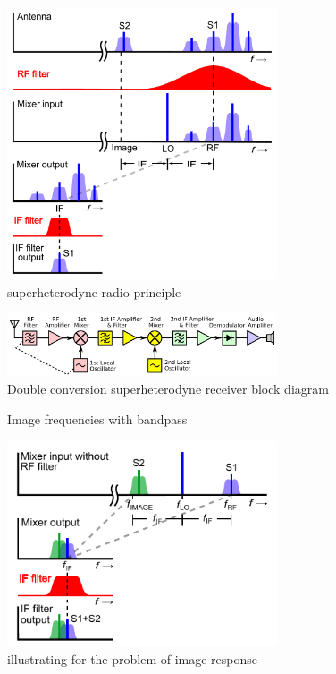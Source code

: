 \begin{figure}[ht]
  \centering
  \includegraphics[width=8cm]{images/Superheterodyne2.pdf}
  \caption{superheterodyne radio principle}
  \label{fig:typical_superheterodyne_receiver_principle}
\end{figure}
\begin{figure}[ht]
  \centering
  \includegraphics[width=8cm]{images/Superheterodyne3.pdf}
  \caption{Double conversion superheterodyne receiver block diagram}
  \label{fig:double_superheterodyne_receiver}
\end{figure}



\begin{figure}[ht]
  \centering
  \caption{Image frequencies with bandpass}
  \label{fig:image_ex_2}
\end{figure}
\begin{figure}[ht]
  \centering
  \includegraphics[width=8cm]{images/Superheterodyne4.pdf}
  \caption{illustrating for the problem of image response}
  \label{fig:image_response}
\end{figure}